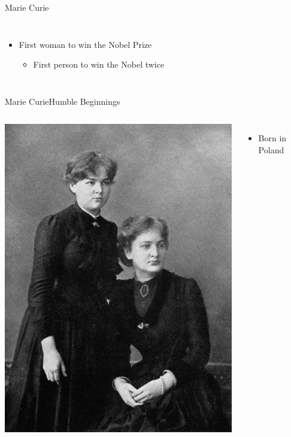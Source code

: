 \documentclass{beamer}
\begin{document}
\begin{CJK}{UTF8}{ipxm}
\begin{frame}{Marie Curie}
\begin{columns}
\begin{itemize}
      \item First woman to win the Nobel Prize
      \begin{itemize}
        \item First person to win the Nobel twice
      \end{itemize}
    \end{itemize}
  \end{columns}
\end{frame}

\begin{frame}{Marie Curie}{Humble Beginnings}
  \begin{columns}
    \includegraphics[width=1\textwidth]{../img/marie_curie_sister}
  \begin{itemize}
    \item Born in Poland
    \medskip


\end{itemize}
\end{columns}
\end{frame}
\end{CJK}
\end{document}
